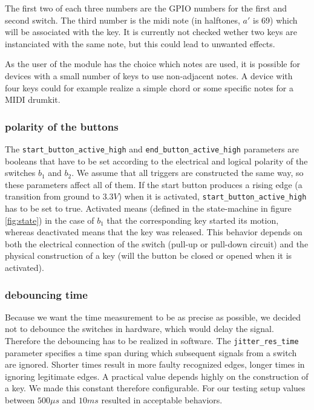 \documentclass[paper=a4,fontsize=11pt,twocolumn,pagesize,bibtotoc]{scrartcl}
\begin{document}
The first two of each three numbers are the GPIO numbers for the first and second switch. The third number is the midi note (in halftones, $a'$ is 69) which will be associated with the key. It is currently not checked wether two keys are instanciated with the same note, but this could lead to unwanted effects.

As the user of the module has the choice which notes are used, it is possible for devices with a small number of keys to use non-adjacent notes. A device with four keys could for example realize a simple chord or some specific notes for a MIDI drumkit.

\subsubsection{polarity of the buttons}
The \texttt{start\_button\_active\_high} and \texttt{end\_button\_active\_high} parameters are booleans that have to be set according to the electrical and logical polarity of the switches $b_1$ and $b_2$. We assume that all triggers are constructed the same way, so these parameters affect all of them. If the start button produces a rising edge (a transition from ground to $3.3V$) when it is activated, \texttt{start\_button\_active\_high} has to be set to true. Activated means (defined in the state-machine in figure \ref{fig:state}) in the case of $b_1$ that the corresponding key started its motion, whereas deactivated means that the key was released. This behavior depends on both the electrical connection of the switch (pull-up or pull-down circuit) and the physical construction of a key (will the button be closed or opened when it is activated).

\subsubsection{debouncing time}
Because we want the time measurement to be as precise as possible, we decided not to debounce the switches in hardware, which would delay the signal. Therefore the debouncing has to be realized in software. The \texttt{jitter\_res\_time} parameter specifies a time span during which subsequent signals from a switch are ignored. Shorter times result in more faulty recognized edges, longer times in ignoring legitimate edges. A practical value depends highly on the construction of a key. We made this constant therefore configurable. For our testing setup values between $500\mu s$ and $10ms$ resulted in acceptable behaviors.
\end{document}
